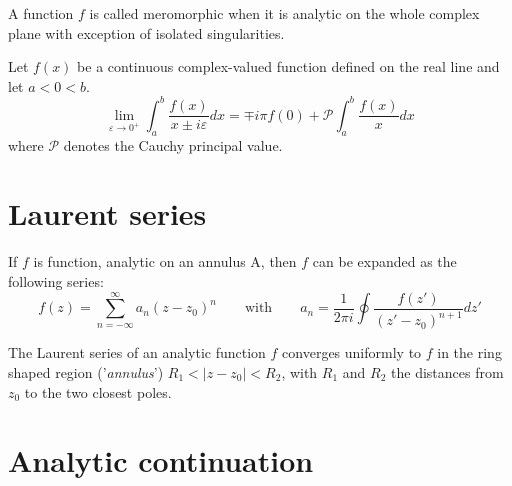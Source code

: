         \begin{definition}[Meromorphic]
		A function $f$ is called meromorphic when it is analytic on the whole complex plane with exception of isolated singularities. 
	\end{definition}

	\begin{theorem}
		Let $f(x)$ be a continuous complex-valued function defined on the real line and let $a<0<b$.
		\begin{equation}
			\lim_{\varepsilon\rightarrow0^+}\int_a^b\frac{f(x)}{x\pm i\varepsilon}dx = \mp i\pi f(0) + \mathcal{P}\int_a^b\frac{f(x)}{x}dx
		\end{equation}
		where $\mathcal{P}$ denotes the Cauchy principal value.
	\end{theorem}
        
\section{Laurent series}
    	
    	\begin{definition}\label{complexcalculus:laurent_series}
        	If $f$ is function, analytic on an annulus A, then $f$ can be expanded as the following series:
        	\begin{equation}
        	        f(z) = \sum^{\infty}_{n=-\infty} a_n (z - z_0)^n \qquad \text{with} \qquad a_n = \frac{1}{2\pi i} \oint \frac{f(z')}{(z' - z_0)^{n+1}} dz'
		\end{equation}
	\end{definition}
        
        \begin{remark}
		The Laurent series of an analytic function $f$ converges uniformly to $f$ in the ring shaped region ('\textit{annulus}') $R_1 < |z - z_0| < R_2$, with $R_1$ and $R_2$ the distances from $z_0$ to the two closest poles.
        \end{remark}
        
        
\section{Analytic continuation}

